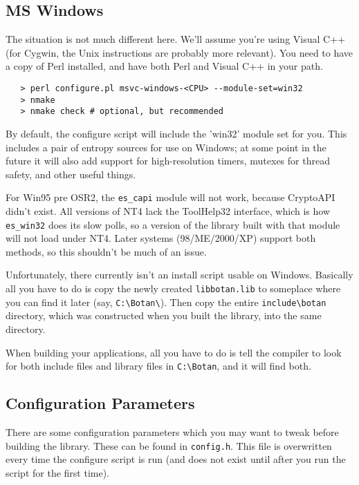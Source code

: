 \documentclass{article}
\newcommand{\filename}[1]{\texttt{#1}}
\begin{document}
\subsection{MS Windows}

The situation is not much different here. We'll assume you're using Visual C++
(for Cygwin, the Unix instructions are probably more relevant). You need to
have a copy of Perl installed, and have both Perl and Visual C++ in your path.

\begin{verbatim}
   > perl configure.pl msvc-windows-<CPU> --module-set=win32
   > nmake
   > nmake check # optional, but recommended
\end{verbatim}

By default, the configure script will include the 'win32' module set for you.
This includes a pair of entropy sources for use on Windows; at some point in
the future it will also add support for high-resolution timers, mutexes for
thread safety, and other useful things.

For Win95 pre OSR2, the \verb|es_capi| module will not work, because
CryptoAPI didn't exist. All versions of NT4 lack the ToolHelp32
interface, which is how \verb|es_win32| does its slow polls, so a
version of the library built with that module will not load under
NT4. Later systems (98/ME/2000/XP) support both methods, so this
shouldn't be much of an issue.

Unfortunately, there currently isn't an install script usable on
Windows. Basically all you have to do is copy the newly created
\filename{libbotan.lib} to someplace where you can find it later (say,
\verb|C:\Botan\|). Then copy the entire \verb|include\botan| directory, which
was constructed when you built the library, into the same directory.

When building your applications, all you have to do is tell the compiler to
look for both include files and library files in \verb|C:\Botan|, and it will
find both.

\pagebreak

\subsection{Configuration Parameters}

There are some configuration parameters which you may want to tweak before
building the library. These can be found in \filename{config.h}. This file is
overwritten every time the configure script is run (and does not exist until
after you run the script for the first time).
\end{document}
